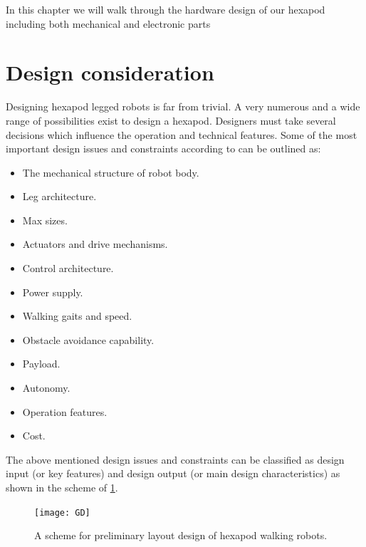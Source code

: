In this chapter we will walk through the hardware design of our hexapod including both mechanical and electronic parts

\section{Design consideration}
Designing hexapod legged robots is far from trivial. A very numerous and a wide range of possibilities exist to design a hexapod. Designers must take several decisions which influence the operation and technical features. Some of the most important design issues and constraints according to \cite{48h} can be outlined as:

\begin{itemize}
	\item The mechanical structure of robot body.
	\item Leg architecture.
	\item Max sizes.
	\item Actuators and drive mechanisms.
	\item Control architecture.
	\item Power supply.
	\item Walking gaits and speed.
	\item Obstacle avoidance capability.
	\item Payload.
	\item Autonomy.
	\item Operation features.
	\item Cost.
\end{itemize}

The above mentioned design issues and constraints can be classified as design input (or key	features) and design output (or main design characteristics) as shown in the scheme of \ref{GD}.

\begin{figure}[H]		
	\centering
	\texttt{[image: GD]}
    \caption{ A scheme for preliminary layout design of hexapod walking robots.}
	\label{GD}
\end{figure}

